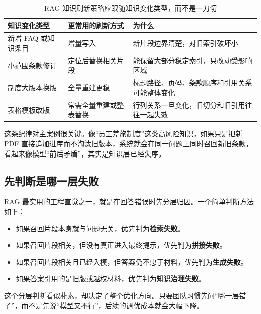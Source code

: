 \begin{table}[H]
\centering
\small
\begin{tabularx}{\textwidth}{>{\raggedright\arraybackslash}p{3cm}>{\raggedright\arraybackslash}p{2.8cm}>{\raggedright\arraybackslash}X}
\toprule
\textbf{知识变化类型} & \textbf{更常用的刷新方式} & \textbf{为什么} \\
\midrule
新增 FAQ 或知识条目 & 增量写入 & 新片段边界清楚，对旧索引破坏小 \\
小范围条款修订 & 定位后替换相关片段 & 能保留大部分稳定索引，只改动受影响区域 \\
制度大版本换版 & 全量重建更稳 & 标题路径、页码、条款顺序和引用关系可能整体变化 \\
表格模板改版 & 常需全量重建或整表替换 & 行列关系一旦变化，旧切分和旧引用往往一起失效 \\
\bottomrule
\end{tabularx}
\caption{RAG 知识刷新策略应跟随知识变化类型，而不是一刀切}
\label{tab:rag-refresh-strategy}
\end{table}

这条纪律对主案例很关键。像“员工差旅制度”这类高风险知识，如果只是把新 PDF 直接追加进库而不淘汰旧版本，系统就会在同一问题上同时召回新旧条款，看起来像模型“前后矛盾”，其实是知识层已经失序。

\subsection{先判断是哪一层失败}
RAG 最实用的工程直觉之一，就是在回答错误时先分层归因。一个简单判断方法如下：
\begin{itemize}
  \item 如果召回片段本身就与问题无关，优先判为\textbf{检索失败}。
  \item 如果召回片段相关，但没有真正进入最终提示，优先判为\textbf{拼接失败}。
  \item 如果召回片段相关且已经入模，但答案仍不忠于材料，优先判为\textbf{生成失败}。
  \item 如果答案引用的是旧版或越权材料，优先判为\textbf{知识治理失败}。
\end{itemize}

这个分层判断看似朴素，却决定了整个优化方向。只要团队习惯先问“哪一层错了”，而不是先说“模型又不行”，后续的调优成本就会大幅下降。

